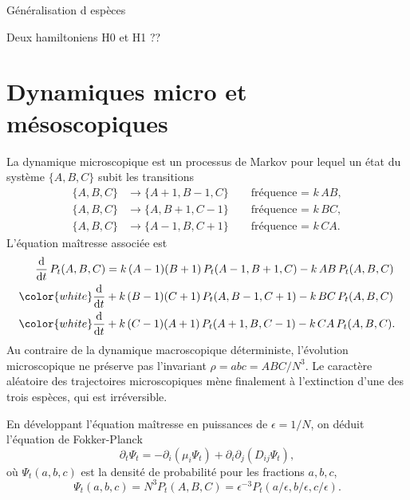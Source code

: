 \documentclass[openany,a4paper,12pt]{article}
\begin{document}
{\color{red} Généralisation d espèces}

{\color{red} Deux hamiltoniens H0 et H1 ??}


\section{Dynamiques micro et mésoscopiques}

\par La dynamique microscopique est un processus de Markov pour lequel un état du système $\{A,B,C\}$ subit les transitions 
%
\begin{equation}\label{dyn_micro}
\begin{split}
	\{A,B,C\} &\longrightarrow \{A+1,B-1,C\}  \qquad \text{fréquence = } k\, AB, \\
	\{A,B,C\} &\longrightarrow \{A,B+1,C-1\}  \qquad \text{fréquence = } k\, BC, \\
	\{A,B,C\} &\longrightarrow \{A-1,B,C+1\}  \qquad \text{fréquence = } k\, CA.
\end{split}
\end{equation}
%
L'équation maîtresse associée est 
%
\begin{equation}\label{eq_maitresse}
\begin{split}
	\frac{\dd}{\dd t}\, P_t(A,B,C) 
	&= k\, (A-1)(B+1)\, P_t(A-1,B+1,C) - k\, AB\, P_t(A,B,C) \\
	{\color{white}\frac{\dd}{\dd t}} %
	&+ k\, (B-1)(C+1)\, P_t(A,B-1,C+1) - k\, BC\, P_t(A,B,C) \\
	{\color{white}\frac{\dd}{\dd t}} %
	&+ k\, (C-1)(A+1)\, P_t(A+1,B,C-1) - k\, CA\, P_t(A,B,C).
\end{split}
\end{equation}
% 
Au contraire de la dynamique macroscopique déterministe, l'évolution microscopique ne préserve pas l'invariant $\rho = abc = ABC/N^3$. Le caractère aléatoire des trajectoires microscopiques mène finalement à l'extinction d'une des trois espèces, qui est irréversible. 

\par En développant l'équation maîtresse en puissances de $\epsilon = 1/N$, on déduit l'équation de Fokker-Planck 
%
\begin{equation}\label{eq_FP}
	\partial_t \Psi_t = - \partial_i ( \mu_i \Psi_t ) + \partial_i\partial_j (D_{ij} \Psi_t),
\end{equation}
%
où $\Psi_t(a,b,c)$ est la densité de probabilité pour les fractions $a,b,c$,
%
\begin{equation}\label{lien_psi_proba}
	\Psi_t(a,b,c) = N^3 P_t(A,B,C) = \epsilon^{-3} P_t(a/\epsilon, b/\epsilon, c/\epsilon).
\end{equation}
\end{document}
